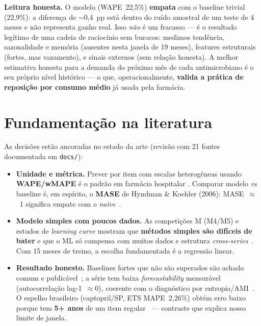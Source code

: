 \documentclass[11pt,a4paper]{article}
\begin{document}
\textbf{Leitura honesta.} O modelo (WAPE~22,5\%) \textbf{empata} com o baseline trivial (22,9\%): a diferença de $\sim$0,4~pp está dentro do ruído amostral de um teste de 4 meses e não representa ganho real. Isso \emph{não} é um fracasso --- é o resultado legítimo de uma cadeia de raciocínio sem buracos: medimos tendência, sazonalidade e memória (ausentes nesta janela de 19 meses), features estruturais (fortes, mas vazamento), e sinais externos (sem relação honesta). A melhor estimativa honesta para a demanda do próximo mês de cada antimicrobiano é o seu próprio nível histórico --- o que, operacionalmente, \textbf{valida a prática de reposição por consumo médio} já usada pela farmácia.

\section{Fundamentação na literatura}
As decisões estão ancoradas no estado da arte (revisão com 21 fontes documentada em \texttt{docs/}):
\begin{itemize}
    \item \textbf{Unidade e métrica.} Prever por item com escalas heterogêneas usando \textbf{WAPE/wMAPE} é o padrão em farmácia hospitalar \cite{springer2026,lightgbm2021}. Comparar modelo \emph{vs} baseline é, em espírito, o \textbf{MASE} de Hyndman \& Koehler (2006): MASE~$\approx$~1 significa empate com o \emph{naïve}~\cite{hyndman2006}.
    \item \textbf{Modelo simples com poucos dados.} As competições M (M4/M5) e estudos de \emph{learning curve} mostram que \textbf{métodos simples são difíceis de bater} e que o ML só compensa com muitos dados e estrutura \emph{cross-series}~\cite{m4comp,sample2019}. Com 15 meses de treino, a escolha fundamentada é a regressão linear.
    \item \textbf{Resultado honesto.} Baselines fortes que não são superados são achado comum e publicável~\cite{conformal2026}; a série tem baixa \emph{forecastability} mensurável (autocorrelação lag-1~$\approx$0), coerente com o diagnóstico por entropia/AMI~\cite{forecastability}. O espelho brasileiro (captopril/SP, ETS MAPE~2,26\%) obtém erro baixo porque tem \textbf{5+ anos} de um item regular~\cite{captopril2025} --- contraste que explica nosso limite de janela.
\end{itemize}

\end{document}
